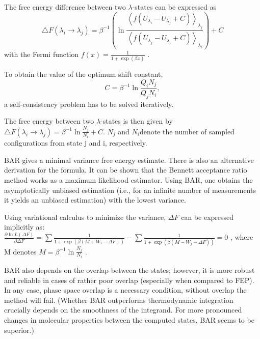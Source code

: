 The free energy difference between two $\lambda$-states can be expressed as
\begin{equation}
\bigtriangleup F\left(\lambda_{i}\rightarrow\lambda_{j}\right)=\beta^{-1}\left(\ln\frac{\left\langle f\left(U_{\lambda_{i}}-U_{\lambda_{j}}+C\right)\right\rangle _{\lambda_{j}}}{\left\langle f\left(U_{\lambda_{j}}-U_{\lambda_{i}}+C\right)\right\rangle _{\lambda_{i}}}\right)+C
\end{equation}
with the Fermi function $f\left(x\right)=\frac{1}{1+\exp\left(\beta x\right)}$
\cite{Bruckner.2011,Gapsys.2015}.

To obtain the value of the optimum shift constant,
\begin{equation}
C=\beta^{-1}\ln\frac{Q_{i}N_{j}}{Q_{j}N_{i}},
\end{equation}
a self-consistency
problem has to be solved iteratively\cite{Gapsys.2015}.

The free energy between two $\lambda$-states is then given by $\bigtriangleup F\left(\lambda_{i}\rightarrow\lambda_{j}\right)=\beta^{-1}\ln\frac{N_{j}}{N_{i}}+C$\cite{Bruckner.2011}.
$N_{j}$ and $N_{i}$denote the number of sampled configurations from
state j and i, respectively.

BAR gives a minimal variance free energy estimate. There is also an
alternative derivation for the formula. It can be shown that the
Bennett acceptance ratio method works as a maximum likelihood estimator.
Using BAR, one obtains the asymptotically unbiased estimation (i.e., for an infinite
number of measurements it yields an unbiased estimation) 
with the lowest variance\cite{Shirts.2003}. 

Using variational calculus to minimize the variance, $\Delta F$ can
be expressed implicitly as:$\frac{\partial\ln L\left(\Delta F\right)}{\partial\Delta F}=\sum\frac{1}{1+\exp\left(\beta\left(M+W_{i}-\Delta F\right)\right)}-\sum\frac{1}{1+\exp\left(\beta\left(M-W_{j}-\Delta F\right)\right)}=0$
, where M denotes $M=\beta^{-1}\ln\frac{N_{j}}{N_{i}}$ \cite{Shirts.2003}.

BAR also depends on the overlap between the states; however, it is
more robust and reliable in cases of rather poor overlap \cite{Ruiter.2013}
(especially when compared to FEP). In any case, phase space overlap is a necessary condition, without overlap the method will fail. (Whether BAR outperforms thermodynamic
integration crucially depends on the smoothness of the integrand.
For more pronounced changes in molecular properties between the computed
states, BAR seems to be superior\cite{Shirts.2013}.)

